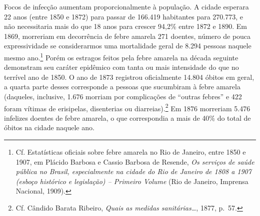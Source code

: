 Focos de infecção aumentam proporcionalmente à população. A cidade
esperara 22 anos (entre 1850 e 1872) para passar de 166.419 habitantes
para 270.773, e não necessitaria mais do que 18 anos para crescer 94,2\%
entre 1872 e 1890. Em 1869, morreriam em decorrência de febre amarela
271 doentes, número de pouca expressividade se considerarmos uma
mortalidade geral de 8.294 pessoas naquele mesmo ano.\footnote{Cf.
  Estatísticas oficiais sobre febre amarela no Rio de Janeiro, entre
  1850 e 1907, em Plácido Barbosa e Cassio Barbosa de Resende, \emph{Os
  serviços de saúde pública no Brasil, especialmente na cidade do Rio de
  Janeiro de 1808 a 1907 (esboço histórico e legislação) -- Primeiro
  Volume} (Rio de Janeiro, Imprensa Nacional, 1909).} Porém os estragos
feitos pela febre amarela na década seguinte demonstram seu caráter
epidêmico com tanta ou mais intensidade do que no terrível ano de 1850.
O ano de 1873 registrou oficialmente 14.804 óbitos em geral, a quarta
parte desses corresponde a pessoas que sucumbiram à febre amarela
(daqueles, inclusive, 1.676 morriam por complicações de ``outras
febres'' e 422 foram vítimas de erisipelas, disenterias ou
diarreias).\footnote{Cf. Cândido Barata Ribeiro, \emph{Quais as medidas
  sanitárias\ldots{}}, 1877, p.~57.} Em 1876 morreriam 5.476 infelizes
doentes de febre amarela, o que correspondia a mais de 40\% do total de
óbitos na cidade naquele ano.

